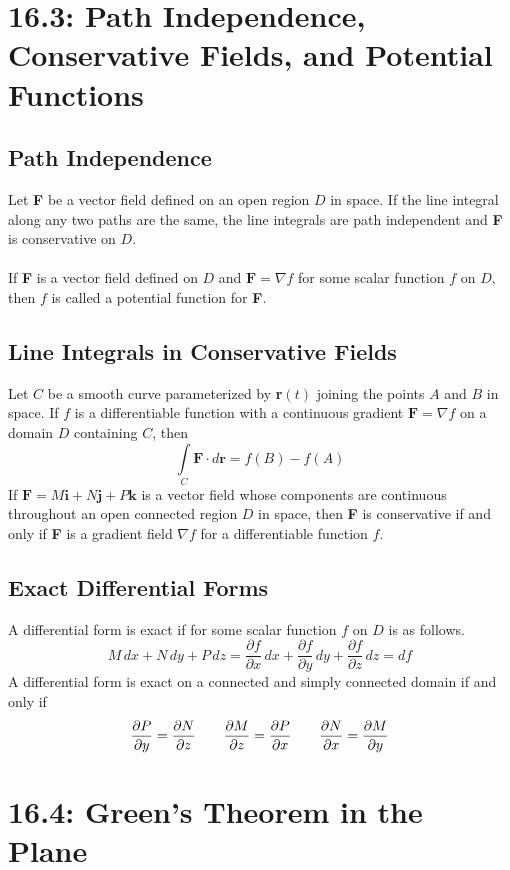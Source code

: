 \documentclass{article}
\begin{document}
\section*{16.3: Path Independence, Conservative Fields, and Potential Functions}
\subsection*{Path Independence}
Let \textbf{F} be a vector field defined on an open region \(D\) in space. If the line integral along any two paths are the same, the line integrals are path independent and \textbf{F} is conservative on \(D\).\\\\
If \textbf{F} is a vector field defined on \(D\) and \(\textbf{F}=\nabla f\) for some scalar function \(f\) on \(D\), then \(f\) is called a potential function for \textbf{F}.
\subsection*{Line Integrals in Conservative Fields}
Let \(C\) be a smooth curve parameterized by \textbf{r}\((t)\) joining the points \(A\) and \(B\) in space. If \(f\) is a differentiable function with a continuous gradient \(\textbf{F}=\nabla f\) on a domain \(D\) containing \(C\), then
\[\int\limits_C\textbf{F}\cdot d\textbf{r}=f(B)-f(A)\]
If \(\textbf{F}=M\textbf{i}+N\textbf{j}+P\textbf{k}\) is a vector field whose components are continuous throughout an open connected region \(D\) in space, then \textbf{F} is conservative if and only if \textbf{F} is a gradient field \(\nabla f\) for a differentiable function \(f\).
\subsection*{Exact Differential Forms}
A differential form is exact if for some scalar function \(f\) on \(D\) is as follows.
\[M\,dx+N\,dy+P\,dz=\frac{\partial f}{\partial x}\,dx+\frac{\partial f}{\partial y}\,dy+\frac{\partial f}{\partial z}\,dz=df\]
A differential form is exact on a connected and simply connected domain if and only if
\[\frac{\partial P}{\partial y}=\frac{\partial N}{\partial z}\hspace{7 mm}\frac{\partial M}{\partial z}=\frac{\partial P}{\partial x}\hspace{7 mm}\frac{\partial N}{\partial x}=\frac{\partial M}{\partial y}\]
\section*{16.4: Green's Theorem in the Plane}
\end{document}
